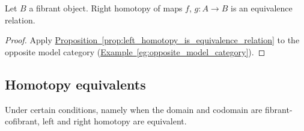 \documentclass[main.tex]{subfiles}
\begin{document}
\begin{proposition}
  \label{prop:right_homotopy_is_equivalence_relation}
  Let $B$ a fibrant object. Right homotopy of maps $f$, $g\colon A \to B$ is an equivalence relation.
\end{proposition}
\begin{proof}
  Apply \hyperref[prop:left_homotopy_is_equivalence_relation]{Proposition~\ref*{prop:left_homotopy_is_equivalence_relation}} to the opposite model category (\hyperref[eg:opposite_model_category]{Example~\ref*{eg:opposite_model_category}}).
\end{proof}

\subsection{Homotopy equivalents}
\label{ssc:homotopy_equivalents}

Under certain conditions, namely when the domain and codomain are fibrant-cofibrant, left and right homotopy are equivalent.
\end{document}
